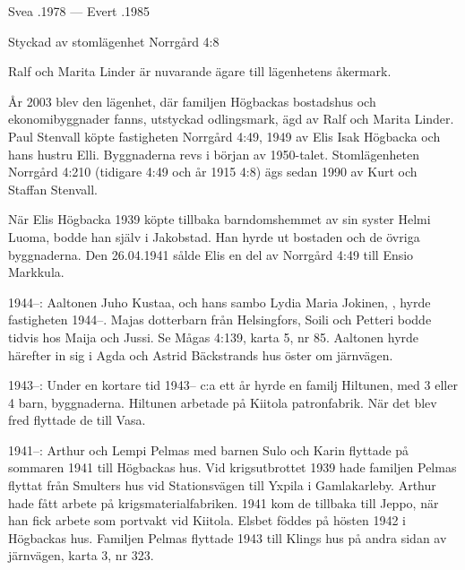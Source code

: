 Svea .1978  ---  Evert .1985




Styckad av stomlägenhet Norrgård 4:8

Ralf och Marita Linder är nuvarande ägare till lägenhetens åkermark.\jhvspace{}


År 2003 blev den lägenhet, där familjen Högbackas bostadshus och ekonomibyggnader fanns, utstyckad odlingsmark, ägd av Ralf och Marita Linder. Paul Stenvall köpte fastigheten Norrgård 4:49, 1949 av Elis Isak Högbacka och hans hustru Elli. Byggnaderna revs i början av 1950-talet. Stomlägenheten Norrgård 4:210 (tidigare 4:49 och år 1915 4:8) ägs sedan 1990 av Kurt och Staffan Stenvall.


När Elis Högbacka 1939 köpte tillbaka barndomshemmet av sin syster Helmi Luoma, bodde han själv i Jakobstad. Han hyrde ut bostaden och de övriga byggnaderna. Den 26.04.1941 sålde Elis en del av Norrgård 4:49 till Ensio Markkula.


1944--:
Aaltonen Juho Kustaa,  och hans sambo Lydia Maria Jokinen, , hyrde fastigheten 1944--. Majas dotterbarn från Helsingfors, Soili och Petteri bodde tidvis hos Maija och Jussi. Se Mågas 4:139, karta 5, nr 85. Aaltonen hyrde härefter in sig i Agda och Astrid Bäckstrands hus öster om järnvägen.

1943--:
Under en kortare tid 1943-- c:a ett år hyrde en familj Hiltunen, med 3 eller 4 barn, byggnaderna. Hiltunen arbetade på Kiitola patronfabrik. När det blev fred flyttade de till Vasa.

1941--:
Arthur och Lempi Pelmas med barnen Sulo och Karin	flyttade på sommaren 1941 till Högbackas hus. Vid krigsutbrottet 1939 hade familjen Pelmas flyttat från Smulters hus vid Stationsvägen till Yxpila i Gamlakarleby. Arthur hade fått arbete på krigsmaterialfabriken. 1941 kom de tillbaka till Jeppo, när han fick arbete som portvakt vid Kiitola. Elsbet föddes på hösten 1942 i Högbackas hus. Familjen Pelmas flyttade 1943 till Klings hus på andra sidan av järnvägen, karta 3, nr 323.


